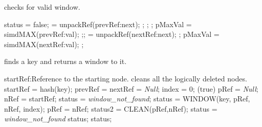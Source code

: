 \documentclass[11pt,onecolumn]{IEEEtran}
\begin{document}
\begin{algorithm}
  \caption{checks for valid window.}
  \label{alg:window}
  \begin{algorithmic}[1]
    \Statex   
      \State status = false;
         = unpackRef(prevRef:next);
          \State 
          ; ; 
        \EndIf
          \State 
          ; 
        \EndIf
        \State pMaxVal = simdMAX(prevRef:val);  
          \State 
          ;; 
        \EndIf
      \EndIf
       = unpackRef(nextRef:next);
        \State 
        ; 
      \EndIf
      \State pMaxVal = simdMAX(nextRef:val);  
        \State 
        ;
      \Else
          \State
        \Else
          \State
        \EndIf
      \EndIf
    \EndFunction
  \end{algorithmic}
\end{algorithm}

\begin{algorithm}
  \caption{finds a key and returns a window to it.}
  \label{alg:find}
  \begin{algorithmic}[1]
    \Require
        \Statex startRef:Reference to the starting node.
    \Ensure
       \Statex cleans all the logically deleted nodes.
    \Statex   
      \State startRef = hash(key);
      \State prevRef = nextRef = {\it Null};
      \State index = 0;      
      \While(true)
        \State pRef = {\it Null};
        \State nRef = startRef;
        \State status = {\it window\_not\_found};
          \State status = WINDOW(key, pRef, nRef, index);
            \State pRef = nRef;
            \State status2 = CLEAN(pRef,nRef);
              \State status = {\it window\_not\_found}
            \EndIf
          \EndIf
        \EndWhile
          \State
          \Return status;
        \EndIf
          \State
          \Return status;
        \EndIf
      \EndWhile
    \EndFunction
  \end{algorithmic}
\end{algorithm}
\end{document}
